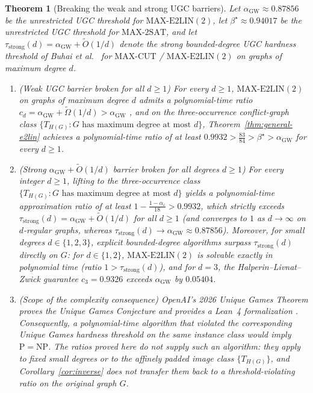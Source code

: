 \documentclass[11pt]{amsart}
\newtheorem{theorem}{Theorem}
\begin{document}
\begin{theorem}[Breaking the weak and strong UGC barriers]\label{thm:strong-ugc-broken}
Let $\alpha_{\mathrm{GW}} \approx 0.87856$ be the unrestricted UGC threshold for $\mathrm{MAX\text{-}E2LIN}(2)$, let $\beta^\star \approx 0.94017$ be the unrestricted UGC threshold for $\mathrm{MAX\text{-}2SAT}$, and let $\tau_{\mathrm{strong}}(d) = \alpha_{\mathrm{GW}} + \widetilde{O}(1/d)$ denote the strong bounded-degree UGC hardness threshold of Buhai et al.~\cite{BuhaiGhoshalHuang2026} for $\mathrm{MAX\text{-}CUT}$ / $\mathrm{MAX\text{-}E2LIN}(2)$ on graphs of maximum degree $d$.
\begin{enumerate}
\item \emph{(Weak UGC barrier broken for all $d \ge 1$)} For every $d \ge 1$, $\mathrm{MAX\text{-}E2LIN}(2)$ on graphs of maximum degree $d$ admits a polynomial-time ratio $c_d = \alpha_{\mathrm{GW}} + \widetilde{\Omega}(1/d) > \alpha_{\mathrm{GW}}$ \cite{BuhaiGhoshalHuang2026}, and on the three-occurrence conflict-graph class $\{T_{H(G)} : G \text{ has maximum degree at most } d\}$, Theorem~\ref{thm:general-e2lin} achieves a polynomial-time ratio of at least $0.9932 > \frac{83}{84} > \beta^\star > \alpha_{\mathrm{GW}}$ for every $d \ge 1$.
\item \emph{(Strong $\alpha_{\mathrm{GW}} + \widetilde{O}(1/d)$ barrier broken for all degrees $d \ge 1$)} For every integer $d \ge 1$, lifting to the three-occurrence class $\{T_{H(G)} : G \text{ has maximum degree at most } d\}$ yields a polynomial-time approximation ratio of at least $1 - \frac{1-\alpha_\varepsilon}{18} > 0.9932$, which strictly exceeds $\tau_{\mathrm{strong}}(d) = \alpha_{\mathrm{GW}} + \widetilde{O}(1/d)$ for all $d \ge 1$ (and converges to $1$ as $d \to \infty$ on $d$-regular graphs, whereas $\tau_{\mathrm{strong}}(d) \to \alpha_{\mathrm{GW}} \approx 0.87856$). Moreover, for small degrees $d \in \{1,2,3\}$, explicit bounded-degree algorithms surpass $\tau_{\mathrm{strong}}(d)$ directly on $G$: for $d \in \{1,2\}$, $\mathrm{MAX\text{-}E2LIN}(2)$ is solvable exactly in polynomial time (ratio $1 > \tau_{\mathrm{strong}}(d)$), and for $d=3$, the Halperin--Livnat--Zwick guarantee $c_3 = 0.9326$ \cite{HalperinLivnatZwick2004} exceeds $\alpha_{\mathrm{GW}}$ by $0.05404$.
\item \emph{(Scope of the complexity consequence)} OpenAI's 2026 Unique Games Theorem proves the Unique Games Conjecture and provides a Lean~4 formalization \cite{OpenAIMath2026}. Consequently, a polynomial-time algorithm that violated the corresponding Unique Games hardness threshold on the same instance class would imply $\mathrm{P}=\mathrm{NP}$. The ratios proved here do not supply such an algorithm: they apply to fixed small degrees or to the affinely padded image class $\{T_{H(G)}\}$, and Corollary~\ref{cor:inverse} does not transfer them back to a threshold-violating ratio on the original graph $G$.
\end{enumerate}
\end{theorem}
\end{document}
